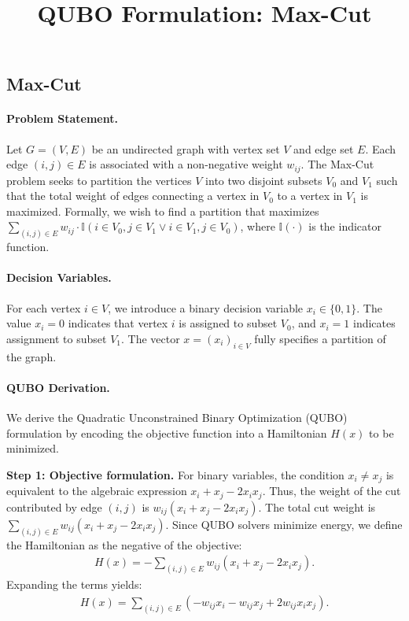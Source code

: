 \documentclass[12pt]{article}
\title{QUBO Formulation: Max-Cut}
\date{}
\begin{document}
\maketitle

\subsection*{Max-Cut}

\paragraph{Problem Statement.}
Let $G=(V,E)$ be an undirected graph with vertex set $V$ and edge set $E$. Each edge $(i,j) \in E$ is associated with a non-negative weight $w_{ij}$. The Max-Cut problem seeks to partition the vertices $V$ into two disjoint subsets $V_0$ and $V_1$ such that the total weight of edges connecting a vertex in $V_0$ to a vertex in $V_1$ is maximized. Formally, we wish to find a partition that maximizes $\sum_{(i,j) \in E} w_{ij} \cdot \mathbb{I}(i \in V_0, j \in V_1 \lor i \in V_1, j \in V_0)$, where $\mathbb{I}(\cdot)$ is the indicator function.

\paragraph{Decision Variables.}
For each vertex $i \in V$, we introduce a binary decision variable $x_i \in \{0, 1\}$. The value $x_i = 0$ indicates that vertex $i$ is assigned to subset $V_0$, and $x_i = 1$ indicates assignment to subset $V_1$. The vector $x = (x_i)_{i \in V}$ fully specifies a partition of the graph.

\paragraph{QUBO Derivation.}
We derive the Quadratic Unconstrained Binary Optimization (QUBO) formulation by encoding the objective function into a Hamiltonian $H(x)$ to be minimized.

\textbf{Step 1: Objective formulation.}
For binary variables, the condition $x_i \neq x_j$ is equivalent to the algebraic expression $x_i + x_j - 2x_ix_j$. Thus, the weight of the cut contributed by edge $(i,j)$ is $w_{ij}(x_i + x_j - 2x_ix_j)$. The total cut weight is $\sum_{(i,j) \in E} w_{ij}(x_i + x_j - 2x_ix_j)$. Since QUBO solvers minimize energy, we define the Hamiltonian as the negative of the objective:
\begin{align}
H(x) = -\sum_{(i,j) \in E} w_{ij}(x_i + x_j - 2x_ix_j).
\end{align}
Expanding the terms yields:
\begin{align}
H(x) = \sum_{(i,j) \in E} \left( -w_{ij}x_i - w_{ij}x_j + 2w_{ij}x_ix_j \right).
\end{align}
\end{document}
